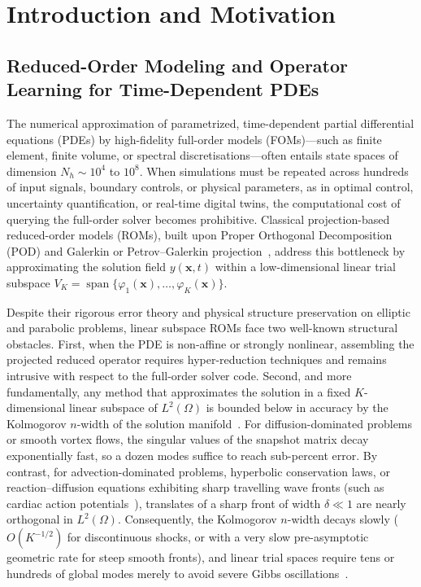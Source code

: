 \section{Introduction and Motivation}
\label{sec:intro}

\subsection{Reduced-Order Modeling and Operator Learning for Time-Dependent PDEs}

The numerical approximation of parametrized, time-dependent partial differential equations (PDEs) by high-fidelity full-order models (FOMs)---such as finite element, finite volume, or spectral discretisations---often entails state spaces of dimension $N_h \sim 10^4$ to $10^8$. When simulations must be repeated across hundreds of input signals, boundary controls, or physical parameters, as in optimal control, uncertainty quantification, or real-time digital twins, the computational cost of querying the full-order solver becomes prohibitive. Classical projection-based reduced-order models (ROMs), built upon Proper Orthogonal Decomposition (POD) and Galerkin or Petrov--Galerkin projection~\cite{quarteroni2015reduced,hesthaven2016certified}, address this bottleneck by approximating the solution field $y(\mathbf{x},t)$ within a low-dimensional linear trial subspace $V_K = \operatorname{span}\{\varphi_1(\mathbf{x}),\dots,\varphi_K(\mathbf{x})\}$.

Despite their rigorous error theory and physical structure preservation on elliptic and parabolic problems, linear subspace ROMs face two well-known structural obstacles. First, when the PDE is non-affine or strongly nonlinear, assembling the projected reduced operator requires hyper-reduction techniques and remains intrusive with respect to the full-order solver code. Second, and more fundamentally, any method that approximates the solution in a fixed $K$-dimensional linear subspace of $L^2(\Omega)$ is bounded below in accuracy by the Kolmogorov $n$-width of the solution manifold~\cite{pinkus1985n,ohlberger2016reduced}. For diffusion-dominated problems or smooth vortex flows, the singular values of the snapshot matrix decay exponentially fast, so a dozen modes suffice to reach sub-percent error. By contrast, for advection-dominated problems, hyperbolic conservation laws, or reaction--diffusion equations exhibiting sharp travelling wave fronts (such as cardiac action potentials~\cite{aliev1996simple}), translates of a sharp front of width $\delta \ll 1$ are nearly orthogonal in $L^2(\Omega)$. Consequently, the Kolmogorov $n$-width decays slowly ($O(K^{-1/2})$ for discontinuous shocks, or with a very slow pre-asymptotic geometric rate for steep smooth fronts), and linear trial spaces require tens or hundreds of global modes merely to avoid severe Gibbs oscillations~\cite{lanthaler2022nonlinear}.

